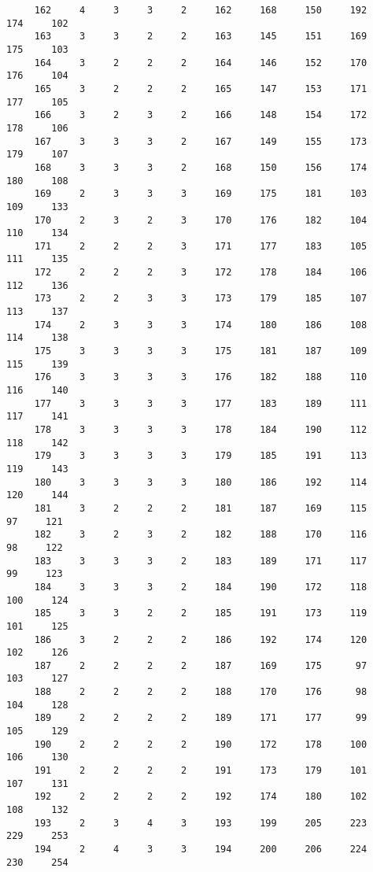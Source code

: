 \begin{verbatim}
     162     4     3     3     2     162     168     150     192     174     102
     163     3     3     2     2     163     145     151     169     175     103
     164     3     2     2     2     164     146     152     170     176     104
     165     3     2     2     2     165     147     153     171     177     105
     166     3     2     3     2     166     148     154     172     178     106
     167     3     3     3     2     167     149     155     173     179     107
     168     3     3     3     2     168     150     156     174     180     108
     169     2     3     3     3     169     175     181     103     109     133
     170     2     3     2     3     170     176     182     104     110     134
     171     2     2     2     3     171     177     183     105     111     135
     172     2     2     2     3     172     178     184     106     112     136
     173     2     2     3     3     173     179     185     107     113     137
     174     2     3     3     3     174     180     186     108     114     138
     175     3     3     3     3     175     181     187     109     115     139
     176     3     3     3     3     176     182     188     110     116     140
     177     3     3     3     3     177     183     189     111     117     141
     178     3     3     3     3     178     184     190     112     118     142
     179     3     3     3     3     179     185     191     113     119     143
     180     3     3     3     3     180     186     192     114     120     144
     181     3     2     2     2     181     187     169     115      97     121
     182     3     2     3     2     182     188     170     116      98     122
     183     3     3     3     2     183     189     171     117      99     123
     184     3     3     3     2     184     190     172     118     100     124
     185     3     3     2     2     185     191     173     119     101     125
     186     3     2     2     2     186     192     174     120     102     126
     187     2     2     2     2     187     169     175      97     103     127
     188     2     2     2     2     188     170     176      98     104     128
     189     2     2     2     2     189     171     177      99     105     129
     190     2     2     2     2     190     172     178     100     106     130
     191     2     2     2     2     191     173     179     101     107     131
     192     2     2     2     2     192     174     180     102     108     132
     193     2     3     4     3     193     199     205     223     229     253
     194     2     4     3     3     194     200     206     224     230     254

\end{verbatim}
